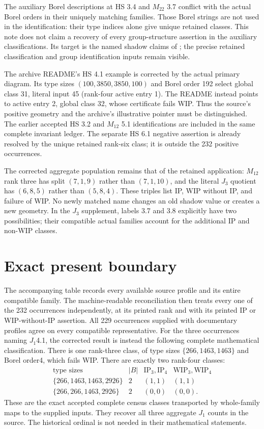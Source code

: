 \documentclass[11pt,a4paper]{article}
\newcommand{\IP}{\mathrm{IP}}
\newcommand{\WIP}{\mathrm{WIP}}
\begin{document}
The auxiliary Borel descriptions at HS 3.4 and $M_{22}$ 3.7
conflict with the actual Borel orders in their uniquely matching
families. Those Borel strings are not used in the identification:
their type indices alone give unique retained classes. This note
does not claim a recovery of every group-structure assertion in
the auxiliary classifications. Its target is the named shadow
claims of \cite{JL}; the precise retained classification and group
identification inputs remain visible.

The archive README's HS 4.1 example is corrected by the actual
primary diagram. Its type sizes $(100,3850,3850,100)$ and Borel
order 192 select global class 31, literal input 45 (rank-four
active entry 1). The README instead points to active entry 2,
global class 32, whose certificate fails WIP. Thus the source's
positive geometry and the archive's illustrative pointer must
be distinguished. The earlier accepted HS 3.2 and $M_{12}$ 5.1
identifications are included in the same complete invariant ledger.
The separate HS 6.1 negative assertion is already resolved by the
unique retained rank-six class; it is outside the 232 positive
occurrences.

The corrected aggregate population remains that of the retained
application: $M_{12}$ rank three has split $(7,1,9)$ rather than
$(7,1,10)$, and the literal $J_3$ quotient has $(6,8,5)$ rather
than $(5,8,4)$. These triples list IP, WIP without IP, and failure
of WIP. No newly matched name changes an old shadow value or
creates a new geometry. In the $J_3$ supplement, labels 3.7 and
3.8 explicitly have two possibilities; their compatible actual
families account for the additional IP and non-WIP classes.

\section{Exact present boundary}
The accompanying table records every available source profile and
its entire compatible family. The machine-readable reconciliation
then treats every one of the 232 occurrences independently, at its
printed rank and with its printed IP or WIP-without-IP assertion.
All 229 occurrences supplied with documentary profiles agree on
every compatible representative. For the three occurrences naming $J_1$4.1, the corrected result is
instead the following complete mathematical classification. There is
one rank-three class, of type sizes $\{266,1463,1463\}$ and Borel
order4, which fails WIP. There are exactly two rank-four classes:
\[
\begin{array}{c|c|c|c}
\text{type sizes}&|B|&\IP_3,\IP_4&\WIP_3,\WIP_4\\\hline
\{266,1463,1463,2926\}&2&(1,1)&(1,1)\\
\{266,266,1463,2926\}&2&(0,0)&(0,0).
\end{array}
\]
These are the exact accepted complete census classes transported by
whole-family maps to the supplied inputs. They recover all three
aggregate $J_1$ counts in the source. The historical ordinal is not
needed in their mathematical statements.
\end{document}
